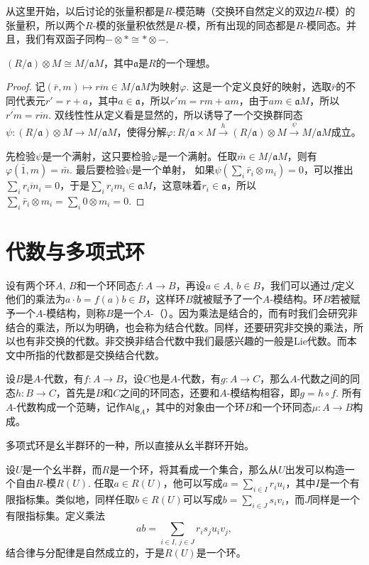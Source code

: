 \para 从这里开始，以后讨论的张量积都是$R$-模范畴（交换环自然定义的双边$R$-模）的张量积，所以两个$R$-模的张量积依然是$R$-模，所有出现的同态都是$R$-模同态。并且，我们有双函子同构$-\otimes *\cong *\otimes -$.

\begin{pro}
$(R/\mathfrak{a})\otimes M\cong M/\mathfrak{a}M$，其中$\mathfrak{a}$是$R$的一个理想。
\end{pro}

\begin{proof}
	记$(\bar{r},m)\mapsto \overline{rm}\in M/\mathfrak{a}M$为映射$\varphi$. 这是一个定义良好的映射，选取$\bar{r}$的不同代表元$r'=r+a$，其中$a\in\mathfrak{a}$，所以$r'm=rm+am$，由于$am\in \mathfrak{a}M$，所以$\overline{r'm}=\overline{rm}$. 双线性性从定义看是显然的，所以诱导了一个交换群同态$\psi:(R/\mathfrak{a})\otimes M\to M/\mathfrak{a}M$，使得分解$\varphi:R/\mathfrak{a}\times M\xrightarrow{h} (R/\mathfrak{a})\otimes M\xrightarrow{\psi} M/\mathfrak{a}M$成立。

	先检验$\psi$是一个满射，这只要检验$\varphi$是一个满射。任取$\bar{m}\in M/\mathfrak{a}M$，则有$\varphi(\bar{1},m)=\bar{m}$. 最后要检验$\psi$是一个单射，
	如果$\psi(\sum_i \bar{r}_i\otimes m_i)=0$，可以推出$\sum_i \overline{r_im_i}=0$，于是$\sum_i r_im_i \in \mathfrak{a}M$，这意味着$r_i\in \mathfrak{a}$，所以$\sum_i \bar{r}_i\otimes m_i=\sum_i 0\otimes m_i=0$.
\end{proof}

\section{代数与多项式环}

设有两个环$A$, $B$和一个环同态$f:A\to B$，再设$a\in A$, $b\in B$，我们可以通过$f$定义他们的乘法为$a\cdot b=f(a)b\in B$，这样环$B$就被赋予了一个$A$-模结构。环$B$若被赋予一个$A$-模结构，则称$B$是一个$A$-（）。因为乘法是结合的，而有时我们会研究非结合的乘法，所以为明确，也会称为结合代数。同样，还要研究非交换的乘法，所以也有非交换的代数。非交换非结合代数中我们最感兴趣的一般是Lie代数。而本文中所指的代数都是交换结合代数。

设$B$是$A$-代数，有$f:A\to B$，设$C$也是$A$-代数，有$g:A\to C$，那么$A$-代数之间的同态$h:B\to C$，首先是$B$和$C$之间的环同态，还要和$A$-模结构相容，即$g=h\circ f$. 所有$A$-代数构成一个范畴，记作$\mathsf{Alg}_A$，其中的对象由一个环$B$和一个环同态$\mu:A\to B$构成。

多项式环是幺半群环的一种，所以直接从幺半群环开始。

\para 设$U$是一个幺半群，而$R$是一个环，将其看成一个集合，那么从$U$出发可以构造一个自由$R$-模$R(U)$. 任取$a\in R(U)$，他可以写成$a=\sum_{i\in I} r_i u_i$，其中$I$是一个有限指标集。类似地，同样任取$b\in R(U)$可以写成$b=\sum_{i\in J} s_i v_i$，而$J$同样是一个有限指标集。定义乘法
\[
	ab=\sum_{i\in I,\, j\in J}r_is_j u_i v_j,
\]
结合律与分配律是自然成立的，于是$R(U)$是一个环。

